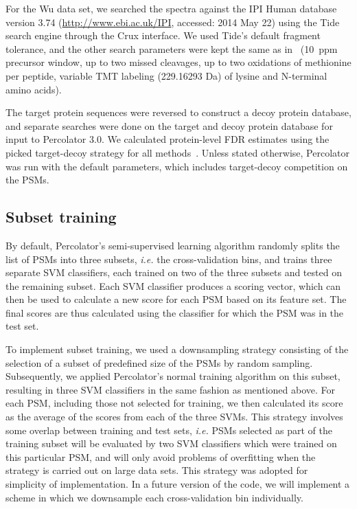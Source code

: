 \documentclass{article}
\begin{document}
For the Wu data set, we searched the spectra against the IPI Human
database version 3.74 (\url{http://www.ebi.ac.uk/IPI}, accessed: 2014
May 22) using the Tide search engine through the Crux interface. We
used Tide's default fragment tolerance, and the other search
parameters were kept the same as in~\cite{wu2013} (10~ppm precursor
window, up to two missed cleavages, up to two oxidations of methionine
per peptide, variable TMT labeling (229.16293 Da) of lysine and
N-terminal amino acids).

The target protein sequences were reversed to construct a decoy 
protein database, and separate searches were done on the target and 
decoy protein database for input to Percolator 3.0. We calculated 
protein-level FDR estimates using the picked target-decoy strategy for 
all methods~\cite{savitski2015scalable}. Unless stated otherwise, 
Percolator was run with the default parameters, which includes 
target-decoy competition on the PSMs.

\subsection*{Subset training}

By default, Percolator's semi-supervised learning algorithm randomly 
splits the list of PSMs into three subsets, {\em i.e.} the 
cross-validation bins, and trains three separate SVM classifiers, each 
trained on two of the three subsets and tested on the remaining 
subset. Each SVM classifier produces a scoring vector, which can then 
be used to calculate a new score for each PSM based on its feature 
set. The final scores are thus calculated using the classifier for 
which the PSM was in the test set.

To implement subset training, we used a downsampling strategy 
consisting of the selection of a subset of predefined size of the PSMs 
by random sampling. Subsequently, we applied Percolator's normal 
training algorithm on this subset, resulting in three SVM classifiers 
in the same fashion as mentioned above. For each PSM, including those 
not selected for training, we then calculated its score as the average 
of the scores from each of the three SVMs. This strategy involves some 
overlap between training and test sets, {\em i.e.} PSMs selected as 
part of the training subset will be evaluated by two SVM classifiers 
which were trained on this particular PSM, and will only avoid 
problems of overfitting when the strategy is carried out on large data 
sets. This strategy was adopted for simplicity of implementation. In a 
future version of the code, we will implement a scheme in which we 
downsample each cross-validation bin individually.
\end{document}
